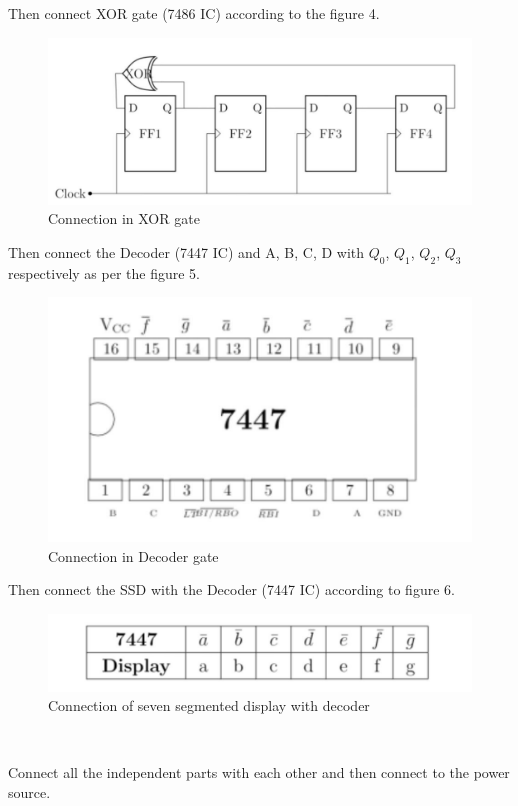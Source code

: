 \documentclass[journal,12pt,twocolumn]{IEEEtran}
\theoremstyle{remark}
\begin{document}
\begin{enumerate}
{				\item Then connect XOR gate (7486 IC) according to the figure 4. 
					\begin{figure}[h]
						\includegraphics[width=\linewidth]{images/circuit_connections.jpg}
						\caption{Connection in XOR gate}
						\label{XOR}
					\end{figure}

				\item Then connect the Decoder (7447 IC) and A, B, C, D with $Q_0$, $Q_1$, $Q_2$, $Q_3$ respectively as per the figure 5.
					\begin{figure}[h]
						\includegraphics[width=\linewidth]{images/7447.jpg}
						\caption{Connection in Decoder gate}
						\label{7447}
					\end{figure}

				\item Then connect the SSD with the Decoder (7447 IC) according to figure 6.
					\begin{figure}[h]
						\includegraphics[width=\linewidth]{images/7447_table.jpg}
						\caption{Connection of seven segmented display with decoder}
						\label{table}
					\end{figure}
					\\
				\item Connect all the independent parts with each other and then connect to the power source.

}
\end{enumerate}
\end{document}
